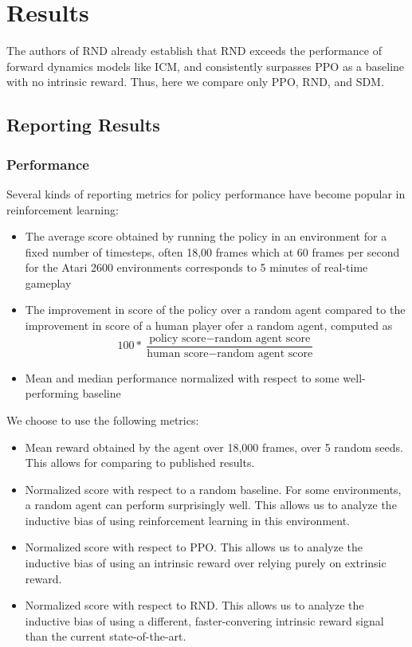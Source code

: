 \documentclass[journal, onecolumn, 12pt, draftclsnofoot]{IEEEtran}
\begin{document}
	\newpage
	\section{Results}
	\label{sec:results}
	\par The authors of RND already establish that RND exceeds the performance of forward dynamics models like ICM, and consistently surpasses PPO as a baseline with no intrinsic reward. Thus, here we compare only PPO, RND, and SDM.
	\subsection{Reporting Results}

	\subsubsection{Performance}
	\par Several kinds of reporting metrics for policy performance have become popular in reinforcement learning:
	\begin{itemize}
		\item The average score obtained by running the policy in an environment for a fixed number of timesteps, often 18,00 frames which at 60 frames per second for the Atari 2600 environments corresponds to 5 minutes of real-time gameplay \cite{ale}
		\item The improvement in score of the policy over a random agent compared to the improvement in score of a human player ofer a random agent, computed as
		\begin{equation}
			100*\frac{\text{policy score} - \text{random agent score}}{\text{human score} - \text{random agent score}}
		\end{equation} \cite{dqn}
		\item Mean and median performance normalized with respect to some well-performing baseline \cite{ddqn}
	\end{itemize}
	\par We choose to use the following metrics:
	\begin{itemize}
		\item Mean reward obtained by the agent over 18,000 frames, over 5 random seeds. This allows for comparing to published results.
		\item Normalized score with respect to a random baseline. For some environments, a random agent can perform surprisingly well. This allows us to analyze the inductive bias of using reinforcement learning in this environment.
		\item Normalized score with respect to PPO. This allows us to analyze the inductive bias of using an intrinsic reward over relying purely on extrinsic reward.
		\item Normalized score with respect to RND. This allows us to analyze the inductive bias of using a different, faster-convering intrinsic reward signal than the current state-of-the-art.
	\end{itemize}
\end{document}
